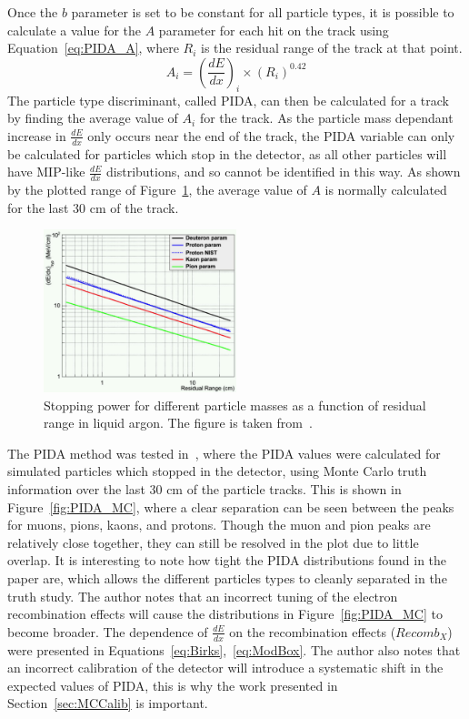 Once the $b$ parameter is set to be constant for all particle types, it is possible to calculate a value for the $A$ parameter for each hit on the track using Equation~\ref{eq:PIDA_A}, where $R_i$ is the residual range of the track at that point.
\begin{equation}
  \label{eq:PIDA_A}
  A_i = \left(\frac{dE}{dx}\right)_i \times \left(R_{i}\right)^{0.42}
\end{equation}
The particle type discriminant, called PIDA, can then be calculated for a track by finding the average value of $A_i$ for the track. As the particle mass dependant increase in $\frac{dE}{dx}$ only occurs near the end of the track, the PIDA variable can only be calculated for particles which stop in the detector, as all other particles will have MIP-like $\frac{dE}{dx}$ distributions, and so cannot be identified in this way. As shown by the plotted range of Figure~\ref{fig:PIDA_loglog}, the average value of $A$ is normally calculated for the last 30 cm of the track. \\

\begin{figure}
  \centering
  \includegraphics[width=0.5\textwidth]{StoppingPower}
  \caption[Stopping power for different particle masses as a function of residual range in liquid argon]
          {Stopping power for different particle masses as a function of residual range in liquid argon. The figure is taken from~\citep{PIDA_Paper}.}
  \label{fig:PIDA_loglog}
\end{figure}

The PIDA method was tested in~\citep{PIDA_Paper}, where the PIDA values were calculated for simulated particles which stopped in the detector, using Monte Carlo truth information over the last 30 cm of the particle tracks. This is shown in Figure~\ref{fig:PIDA_MC}, where a clear separation can be seen between the peaks for muons, pions, kaons, and protons. Though the muon and pion peaks are relatively close together, they can still be resolved in the plot due to little overlap. It is interesting to note how tight the PIDA distributions found in the paper are, which allows the different particles types to cleanly separated in the truth study. The author notes that an incorrect tuning of the electron recombination effects will cause the distributions in Figure~\ref{fig:PIDA_MC} to become broader. The dependence of $\frac{dE}{dx}$ on the recombination effects ($Recomb_{X}$) were presented in Equations~\ref{eq:Birks},~\ref{eq:ModBox}. The author also notes that an incorrect calibration of the detector will introduce a systematic shift in the expected values of PIDA, this is why the work presented in Section~\ref{sec:MCCalib} is important. \\

